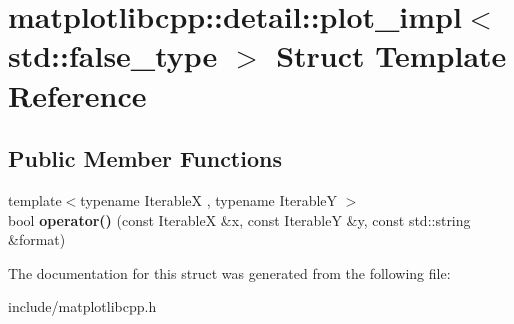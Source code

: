 \hypertarget{structmatplotlibcpp_1_1detail_1_1plot__impl_3_01std_1_1false__type_01_4}{}\section{matplotlibcpp\+:\+:detail\+:\+:plot\+\_\+impl$<$ std\+:\+:false\+\_\+type $>$ Struct Template Reference}
\label{structmatplotlibcpp_1_1detail_1_1plot__impl_3_01std_1_1false__type_01_4}
\subsection*{Public Member Functions}
\begin{DoxyCompactItemize}
\item 
{\footnotesize template$<$typename IterableX , typename IterableY $>$ }\\bool {\bfseries operator()} (const IterableX \&x, const IterableY \&y, const std\+::string \&format)\hypertarget{structmatplotlibcpp_1_1detail_1_1plot__impl_3_01std_1_1false__type_01_4_ab430540b63185e4a76526b47d3b195e5}{}\label{structmatplotlibcpp_1_1detail_1_1plot__impl_3_01std_1_1false__type_01_4_ab430540b63185e4a76526b47d3b195e5}

\end{DoxyCompactItemize}


The documentation for this struct was generated from the following file\+:\begin{DoxyCompactItemize}
\item 
include/matplotlibcpp.\+h\end{DoxyCompactItemize}
